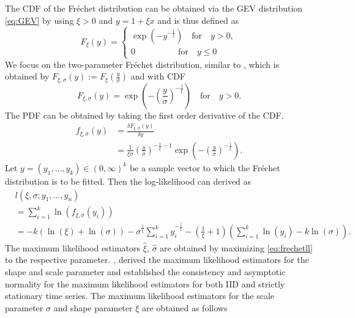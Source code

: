 \documentclass[a4paper,12pt]{article}
\theoremstyle{plain}
\begin{document}
The CDF of the Fr\'echet distribution can be obtained via the GEV distribution \eqref{eq:GEV} by using $\xi>0$ and $y=1+\xi x$ and is thus defined as 
\begin{equation}
    F_{\xi}(y) = \begin{cases}
               \exp{\left(-y^{-\frac{1}{\xi}}\right)} \quad \textrm{for} \quad y > 0,\\
              0 \quad\quad\quad\quad\quad \textrm{for} \quad y\leq0
            \end{cases}
\label{eq:frechet}
\end{equation}
We focus on the two-parameter Fr\'echet distribution, similar to , which is obtained by $F_{\xi, \sigma}\left(y\right):=F_{\xi}\left(\frac{y}{\sigma}\right)$ and with CDF
\begin{equation}
    F_{\xi, \sigma}\left(y\right) = \exp{\left(-\left(\frac{y}{\sigma}\right)^{-\frac{1}{\xi}}\right)} \quad \textrm{for} \quad y > 0.
    \label{eq:frechetcdf}
\end{equation}
The PDF can be obtained by taking the first order derivative of the CDF.
\begin{equation}
    \begin{split}
    f_{\xi, \sigma}\left(y\right) &= \frac{\delta F_{\xi, \sigma}(y)}{\delta y} \\
    &= \frac{1}{\xi\sigma}\left(\frac{y}{\sigma}\right)^{-\frac{1}{\xi} -1}\exp{\left(-\left(\frac{y}{\sigma}\right)^{-\frac{1}{\xi}}\right)}.
    \end{split}
    \label{eq:gevpdf}
\end{equation}
Let $y=\left(y_1,\dots,y_k\right)\in \left(0, \infty\right)^k$ be a sample vector to which the Fr\'echet distribution is to be fitted. Then the log-likelihood can derived as
\begin{equation}
\begin{split}
    & l\left(\xi,\sigma;y_1, \dots, y_n\right) \\
    & = \sum_{i=1}^{k}\ln{\left(f_{\xi,\sigma}\left(y_i\right)\right)} \\
    & = -k\left(\ln{\left(\xi\right)}+\ln{\left(\sigma\right)}\right)-\sigma^{\frac{1}{\xi}}\sum_{i=1}^k y_i^{-\frac{1}{\xi}} - \left(\frac{1}{\xi}+1\right)\left(\sum_{i=1}^k \ln{\left(y_i\right)} - k\ln{\left(\sigma\right)}\right).
    \label{eq:frechetll}
\end{split}
\end{equation}
The maximum likelihood estimators $\hat{\xi}$, $\hat{\sigma}$ are obtained by maximizing \eqref{eq:frechetll} to the respective parameter. , derived the maximum likelihood estimators for the shape and scale parameter and established the consistency and asymptotic normality for the maximum likelihood estimators for both IID and strictly stationary time series. The maximum likelihood estimators for the scale parameter $\sigma$ and shape parameter $\xi$ are obtained as follows
\end{document}
